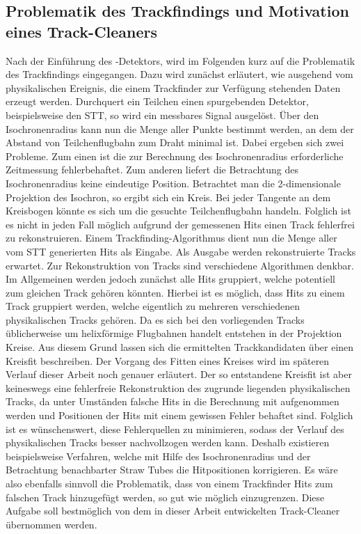 \subsection{Problematik des Trackfindings und Motivation eines Track-Cleaners}
Nach der Einführung des \pnd{}-Detektors, wird im Folgenden kurz auf die Problematik des Trackfindings eingegangen. Dazu wird zunächst erläutert, wie ausgehend vom physikalischen Ereignis, die einem Trackfinder zur Verfügung stehenden Daten erzeugt werden. Durchquert ein Teilchen einen spurgebenden Detektor, beispielsweise den STT, so wird ein messbares Signal ausgelöst. Über den Isochronenradius kann nun die Menge aller Punkte bestimmt werden, an dem der Abstand von Teilchenflugbahn zum Draht minimal ist. Dabei ergeben sich zwei Probleme. Zum einen ist die zur Berechnung des Isochronenradius erforderliche Zeitmessung fehlerbehaftet. Zum anderen liefert die Betrachtung des Isochronenradius keine eindeutige Position. Betrachtet man die 2-dimensionale Projektion des Isochron, so ergibt sich ein Kreis. Bei jeder Tangente an dem Kreisbogen könnte es sich um die gesuchte Teilchenflugbahn handeln. Folglich ist es nicht in jeden Fall möglich aufgrund der gemessenen Hits einen Track fehlerfrei zu rekonstruieren. Einem Trackfinding-Algorithmus dient nun die Menge aller vom STT generierten Hits als Eingabe. Als Ausgabe werden rekonstruierte Tracks erwartet. Zur Rekonstruktion von Tracks sind verschiedene Algorithmen denkbar. Im Allgemeinen werden jedoch zunächst alle Hits gruppiert, welche potentiell zum gleichen Track gehören könnten. Hierbei ist es möglich, dass Hits zu einem Track gruppiert werden, welche eigentlich zu mehreren verschiedenen physikalischen Tracks gehören. Da es sich bei den vorliegenden Tracks üblicherweise um helixförmige Flugbahnen handelt entstehen in der Projektion Kreise. Aus diesem Grund lassen sich die ermittelten Trackkandidaten über einen Kreisfit beschreiben. Der Vorgang des Fitten eines Kreises wird im späteren Verlauf dieser Arbeit noch genauer erläutert. Der so entstandene Kreisfit ist aber keineswegs eine fehlerfreie Rekonstruktion des zugrunde liegenden physikalischen Tracks, da unter Umständen falsche Hits in die Berechnung mit aufgenommen werden und Positionen der Hits mit einem gewissen Fehler behaftet sind. Folglich ist es wünschenswert, diese Fehlerquellen zu minimieren, sodass der Verlauf des physikalischen Tracks besser nachvollzogen werden kann. Deshalb existieren beispielsweise Verfahren, welche mit Hilfe des Isochronenradius und der Betrachtung benachbarter Straw Tubes die Hitpositionen korrigieren. Es wäre also ebenfalls sinnvoll die Problematik, dass von einem Trackfinder Hits zum falschen Track hinzugefügt werden, so gut wie möglich einzugrenzen. Diese Aufgabe soll bestmöglich von dem in dieser Arbeit entwickelten Track-Cleaner übernommen werden.